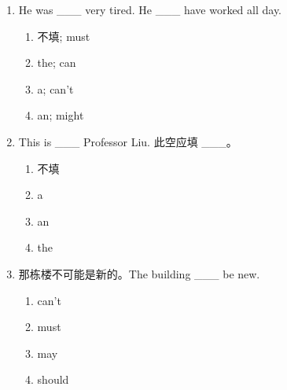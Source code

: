 \documentclass[11pt,a4paper]{ctexart}
\begin{document}
\begin{enumerate}[leftmargin=*,itemsep=4pt]
\begin{enumerate}[label=\Alph*.,leftmargin=2em,itemsep=1pt,topsep=2pt]
\end{enumerate}
\item He was \_\_\_ very tired. He \_\_\_ have worked all day.
\begin{enumerate}[label=\Alph*.,leftmargin=2em,itemsep=1pt,topsep=2pt]
\item 不填; must
\item the; can
\item a; can’t
\item an; might
\end{enumerate}
\item This is \_\_\_ Professor Liu. 此空应填 \_\_\_。
\begin{enumerate}[label=\Alph*.,leftmargin=2em,itemsep=1pt,topsep=2pt]
\item 不填
\item a
\item an
\item the
\end{enumerate}
\item 那栋楼不可能是新的。The building \_\_\_ be new.
\begin{enumerate}[label=\Alph*.,leftmargin=2em,itemsep=1pt,topsep=2pt]
\item can’t
\item must
\item may
\item should
\end{enumerate}
\end{enumerate}

\newpage
\end{document}
